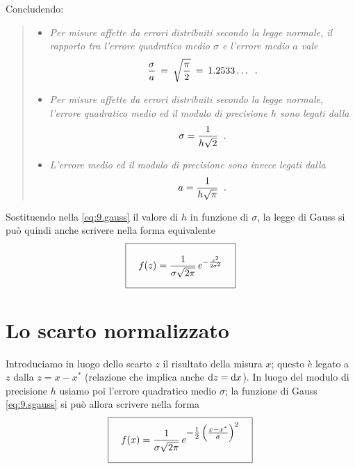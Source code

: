 Concludendo:
\begin{quote}%
  \begin{itemize}
  \item \textit{Per misure affette da errori distribuiti
      secondo la legge normale, il rapporto tra l'errore
      quadratico medio $\sigma$ e l'errore medio $a$ vale}
    \begin{equation*}
      \frac{\sigma}{a} \: = \:
      \sqrt{\frac{\pi}{2}} \: = \:
      1.2533\ldots \peq .
    \end{equation*}
  \item \textit{Per misure affette da errori distribuiti
      secondo la legge normale, l'errore quadratico medio ed
      il modulo di precisione $h$ sono legati dalla}
    \begin{equation*}
      \sigma = \frac{1}{h\sqrt{2}} \;\; .
    \end{equation*}
  \item \textit{L'errore medio ed il modulo di precisione
      sono invece legati dalla}
    \begin{equation*}
      a = \frac{1}{h\sqrt{\pi}} \;\; .
    \end{equation*}
  \end{itemize}%
\end{quote}%
%
%

Sostituendo nella \eqref{eq:9.gauss} il valore di $h$ in
funzione di $\sigma$, la legge di Gauss si pu\`o quindi
anche scrivere nella forma equivalente
\begin{equation} \label{eq:9.sgauss}
  \boxed{ \rule[-6mm]{0mm}{14mm} \quad
    f(z) = \dfrac{1}{\sigma \sqrt{2\pi}}
    \, e^{- \frac{z^2}{2 \sigma^2}} \quad }
\end{equation}

\section{Lo scarto normalizzato}%
%
\label{ch:9.scanor}
Introduciamo in luogo dello scarto $z$ il risultato della
misura $x$; questo \`e legato a $z$ dalla $ z=x-x^* $
(relazione che implica anche $ \mathrm{d} z = \mathrm{d} x $).  In luogo
del modulo di precisione $h$ usiamo poi l'errore quadratico
medio $\sigma$; la funzione di Gauss \eqref{eq:9.sgauss} si
pu\`o allora scrivere nella forma
\begin{equation*}
  \boxed{ \rule[-6mm]{0mm}{14mm} \quad
    f(x) =
    \dfrac{1}{\sigma \sqrt{2\pi}}
    \, e^{\textstyle -\frac{1}{2} \left(
        \frac{x - x^*}{\sigma} \right) ^2 } \quad }
\end{equation*}

